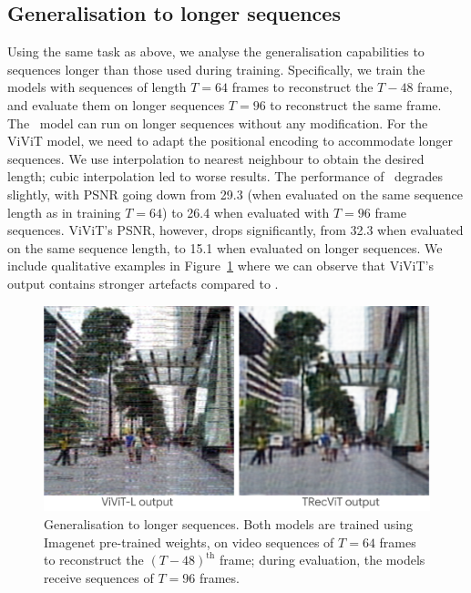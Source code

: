 \subsection{Generalisation to longer sequences}
\label{sec:gentask}

Using the same task as above, we analyse the generalisation capabilities to sequences longer than those used during training. Specifically, we train the models with sequences of length $T=64$ frames to reconstruct the $T-48$ frame, and evaluate them on longer sequences $T=96$ to reconstruct the same frame. The \ssm\ model can run on longer sequences without any modification. For the ViViT model, we need to adapt the positional encoding to accommodate longer sequences. We use interpolation to nearest neighbour to obtain the desired length; cubic interpolation led to worse results. The performance of \ssm\ degrades slightly, with PSNR going down from 29.3 (when evaluated on the same sequence length as in training $T=64$) to 26.4 when evaluated with $T=96$ frame sequences. ViViT's PSNR, however, drops significantly, from 32.3 when evaluated on the same sequence length, to 15.1 when evaluated on longer sequences. We include qualitative examples in Figure~\ref{fig:gentask} where we can observe that ViViT's output contains stronger artefacts compared to \ssm. 

\begin{figure}[h]
  \centering
  \includegraphics[width=\linewidth]{img/genlong.png}
  \caption{Generalisation to longer sequences. Both models are trained using Imagenet pre-trained weights, on video sequences of $T=64$ frames to reconstruct the $(T-48)^\text{th}$ frame; during evaluation, the models receive sequences of $T=96$ frames.}
  \label{fig:gentask}
\end{figure}
